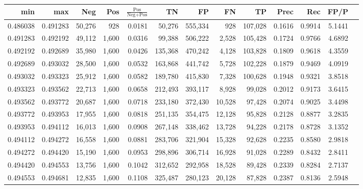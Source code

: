 \begin{tabular}{rrrrrrrrrrrrr}
\toprule
     min &      max &    Neg &   Pos & $\frac{\text{Pos}}{\text{Neg}+\text{Pos}}$ &      TN &      FP &      FN &      TP &   Prec &    Rec &   FP/P \\
\midrule
0.486038 & 0.491283 & 50,276 &   928 &                                     0.0181 &  50,276 & 555,334 &     928 & 107,028 & 0.1616 & 0.9914 & 5.1441 \\
0.491283 & 0.492192 & 49,112 & 1,600 &                                     0.0316 &  99,388 & 506,222 &   2,528 & 105,428 & 0.1724 & 0.9766 & 4.6892 \\
0.492192 & 0.492689 & 35,980 & 1,600 &                                     0.0426 & 135,368 & 470,242 &   4,128 & 103,828 & 0.1809 & 0.9618 & 4.3559 \\
0.492689 & 0.493032 & 28,500 & 1,600 &                                     0.0532 & 163,868 & 441,742 &   5,728 & 102,228 & 0.1879 & 0.9469 & 4.0919 \\
0.493032 & 0.493323 & 25,912 & 1,600 &                                     0.0582 & 189,780 & 415,830 &   7,328 & 100,628 & 0.1948 & 0.9321 & 3.8518 \\
0.493323 & 0.493562 & 22,713 & 1,600 &                                     0.0658 & 212,493 & 393,117 &   8,928 &  99,028 & 0.2012 & 0.9173 & 3.6415 \\
0.493562 & 0.493772 & 20,687 & 1,600 &                                     0.0718 & 233,180 & 372,430 &  10,528 &  97,428 & 0.2074 & 0.9025 & 3.4498 \\
0.493772 & 0.493953 & 17,955 & 1,600 &                                     0.0818 & 251,135 & 354,475 &  12,128 &  95,828 & 0.2128 & 0.8877 & 3.2835 \\
0.493953 & 0.494112 & 16,013 & 1,600 &                                     0.0908 & 267,148 & 338,462 &  13,728 &  94,228 & 0.2178 & 0.8728 & 3.1352 \\
0.494112 & 0.494272 & 16,558 & 1,600 &                                     0.0881 & 283,706 & 321,904 &  15,328 &  92,628 & 0.2235 & 0.8580 & 2.9818 \\
0.494272 & 0.494420 & 15,190 & 1,600 &                                     0.0953 & 298,896 & 306,714 &  16,928 &  91,028 & 0.2289 & 0.8432 & 2.8411 \\
0.494420 & 0.494553 & 13,756 & 1,600 &                                     0.1042 & 312,652 & 292,958 &  18,528 &  89,428 & 0.2339 & 0.8284 & 2.7137 \\
0.494553 & 0.494681 & 12,835 & 1,600 &                                     0.1108 & 325,487 & 280,123 &  20,128 &  87,828 & 0.2387 & 0.8136 & 2.5948 \\

\end{tabular}
